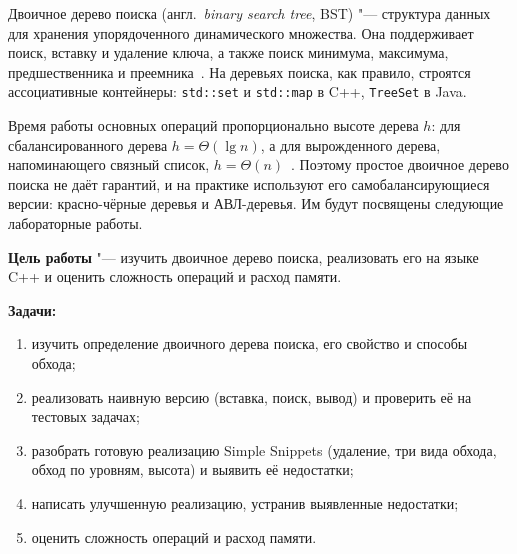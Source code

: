 \documentclass[otchet]{SCWorks}
\begin{document}

\date{2026}

\maketitle

\secNumbering

\tableofcontents




\intro

Двоичное дерево поиска (англ.\ \emph{binary search tree}, BST) "--- структура
данных для хранения упорядоченного динамического множества. Она поддерживает
поиск, вставку и удаление ключа, а также поиск минимума, максимума,
предшественника и преемника~\cite{kormen}. На деревьях поиска, как правило,
строятся ассоциативные контейнеры: \texttt{std::set} и \texttt{std::map} в
C++, \texttt{TreeSet} в Java.
 
Время работы основных операций пропорционально высоте дерева $h$: для
сбалансированного дерева $h = \Theta(\lg n)$, а для вырожденного дерева,
напоминающего связный список, $h = \Theta(n)$~\cite{kormen}. Поэтому простое
двоичное дерево поиска не даёт гарантий, и на практике используют его
самобалансирующиеся версии: красно-чёрные деревья и АВЛ-деревья. Им будут
посвящены следующие лабораторные работы.
 
\textbf{Цель работы} "--- изучить двоичное дерево поиска, реализовать его на
языке C++ и оценить сложность операций и расход памяти.
 
\textbf{Задачи:}
\begin{enumerate}
  \item изучить определение двоичного дерева поиска, его свойство и способы обхода;
  \item реализовать наивную версию (вставка, поиск, вывод) и проверить её на тестовых задачах;
  \item разобрать готовую реализацию Simple Snippets (удаление, три вида обхода, обход по уровням, высота) и выявить её недостатки;
  \item написать улучшенную реализацию, устранив выявленные недостатки;
  \item оценить сложность операций и расход памяти.
\end{enumerate}
\end{document}
